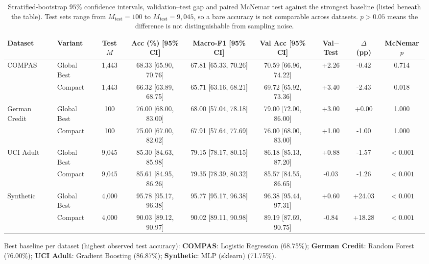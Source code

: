 \begin{table}[t]
\centering
\caption{Stratified-bootstrap $95\%$ confidence intervals, validation--test gap and paired McNemar test against the strongest baseline (listed beneath the table). Test sets range from $M_{\text{test}}=100$ to $M_{\text{test}}=9{,}045$, so a bare accuracy is not comparable across datasets. $p>0.05$ means the difference is not distinguishable from sampling noise.}
\label{tab:statistical_reliability}
\setlength{\tabcolsep}{4pt}
\begin{tabular}{ll c cc cc c c}
\toprule
\textbf{Dataset} & \textbf{Variant} & \textbf{Test $M$} & \textbf{Acc (\%) [95\% CI]} & \textbf{Macro-F1 [95\% CI]} & \textbf{Val Acc [95\% CI]} & \textbf{Val$-$Test} & \textbf{$\Delta$ (pp)} & \textbf{McNemar $p$} \\
\midrule
\multirow{2}{*}{COMPAS} & Global Best & 1,443 & 68.33 [65.90, 70.76] & 67.81 [65.33, 70.26] & 70.59 [66.96, 74.22] & +2.26 & -0.42 & 0.714 \\
 & Compact & 1,443 & 66.32 [63.89, 68.75] & 65.71 [63.16, 68.21] & 69.72 [65.92, 73.36] & +3.40 & -2.43 & 0.018 \\
\midrule
\multirow{2}{*}{German Credit} & Global Best & 100 & 76.00 [68.00, 83.00] & 68.00 [57.04, 78.18] & 79.00 [72.00, 86.00] & +3.00 & +0.00 & 1.000 \\
 & Compact & 100 & 75.00 [67.00, 82.02] & 67.91 [57.64, 77.69] & 76.00 [68.00, 83.00] & +1.00 & -1.00 & 1.000 \\
\midrule
\multirow{2}{*}{UCI Adult} & Global Best & 9,045 & 85.30 [84.63, 85.98] & 79.15 [78.17, 80.15] & 86.18 [85.13, 87.20] & +0.88 & -1.57 & $<0.001$ \\
 & Compact & 9,045 & 85.61 [84.95, 86.26] & 79.35 [78.39, 80.32] & 85.57 [84.55, 86.65] & -0.03 & -1.26 & $<0.001$ \\
\midrule
\multirow{2}{*}{Synthetic} & Global Best & 4,000 & 95.78 [95.17, 96.38] & 95.77 [95.17, 96.38] & 96.38 [95.44, 97.31] & +0.60 & +24.03 & $<0.001$ \\
 & Compact & 4,000 & 90.03 [89.12, 90.97] & 90.02 [89.11, 90.98] & 89.19 [87.69, 90.75] & -0.84 & +18.28 & $<0.001$ \\
\bottomrule
\end{tabular}
\par\vspace{1pt}
{\footnotesize Best baseline per dataset (highest observed test accuracy): \textbf{COMPAS}: Logistic Regression (68.75\%); \textbf{German Credit}: Random Forest (76.00\%); \textbf{UCI Adult}: Gradient Boosting (86.87\%); \textbf{Synthetic}: MLP (sklearn) (71.75\%).}
\end{table}
